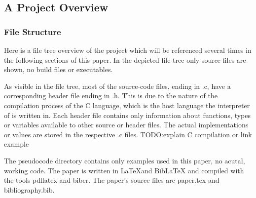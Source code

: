 \documentclass[12pt,a4paper,man]{apa7}
\begin{document}
\subsection{A Project Overview}

\newpage\subsubsection{File Structure}
Here is a file tree overview of the project which will be referenced
several times in the following sections of this paper. In the depicted file tree
only source files are shown, no build files or executables.
\small{\setlength{\DTbaselineskip}{10pt}}

As visible in the file tree, most of the source-code files, ending in .c,
have a corresponding header file ending in .h. This is due to the nature
of the compilation process of the C language, which is the host language
the interpreter of \name is written in.
Each header file contains only information about functions, types or variables
available to other source or header files. The actual implementations or values
are stored in the respective .c files.
TODO:explain C compilation or link example

The pseudocode directory contains only examples used in this paper, no acutal,
working code. The paper is written in \LaTeX and BibLaTeX and compiled with
the tools pdflatex and biber. The paper's source files are paper.tex and
bibliography.bib.
\end{document}
